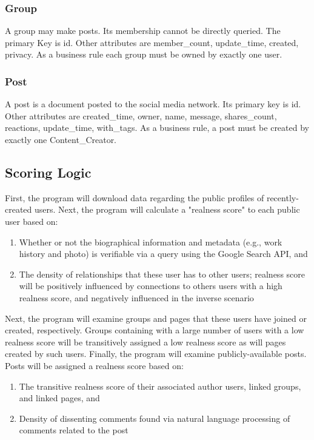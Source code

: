 \documentclass{article}
\begin{document}
\subsubsection{Group}
A group may make posts. Its membership cannot be directly queried. The primary Key is id. Other attributes are member_count, update_time, created, privacy. As a business rule each group must be owned by exactly one user.

\subsubsection{Post}

A post is a document posted to the social media network. Its primary key is id. Other attributes are created_time, owner, name, message, shares_count, reactions, update_time, with_tags. As a business rule, a post must be created by exactly one Content_Creator.

\subsection*{Scoring Logic}

First, the program will download data regarding the public profiles of recently-created users.  Next, the program will calculate a "realness score" to each public user based on:

\begin{enumerate}
\item Whether or not the biographical information and metadata (e.g., work history and photo) is verifiable via a query using the Google Search API, and
\item The density of relationships that these user has to other users; realness score will be positively influenced by connections to others users with a high realness score, and negatively influenced in the inverse scenario
\end{enumerate}

Next, the program will examine groups and pages that these users have joined or created, respectively. Groups containing with a large number of users with a low realness score will be transitively assigned a low realness score as will pages created by such users. Finally, the program will examine publicly-available posts. Posts will be assigned a realness score based on:

\begin{enumerate}
\item The transitive realness score of their associated author users, linked groups, and linked pages, and
\item Density of dissenting comments found via natural language processing of comments related to the post
\end{enumerate}
\end{document}
